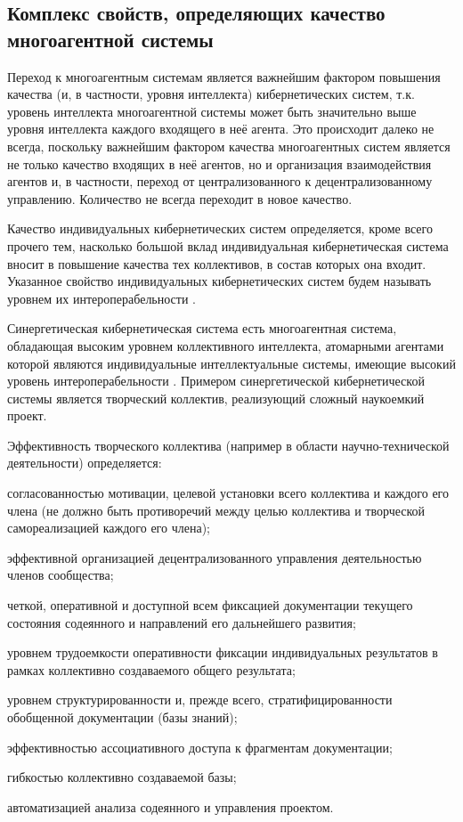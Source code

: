 \subsection{Комплекс свойств, определяющих качество многоагентной системы}
{\label{sec_mas_overall_quality}} 

Переход к многоагентным системам является важнейшим фактором повышения качества (и, в частности, уровня интеллекта) кибернетических систем, т.к. уровень интеллекта многоагентной системы может быть значительно выше уровня интеллекта каждого входящего в неё агента. 
Это происходит далеко не всегда, поскольку важнейшим фактором качества многоагентных систем является не только качество входящих в неё агентов, но и организация взаимодействия агентов и, в частности, переход от централизованного к децентрализованному управлению. 
Количество не всегда переходит в новое качество.

Качество индивидуальных кибернетических систем определяется, кроме всего прочего тем, насколько большой вклад индивидуальная кибернетическая система вносит в повышение качества тех коллективов, в состав которых она входит.
Указанное свойство индивидуальных кибернетических систем будем называть уровнем их интероперабельности .

Синергетическая кибернетическая система есть многоагентная система, обладающая высоким уровнем коллективного интеллекта, атомарными агентами которой являются индивидуальные интеллектуальные системы, имеющие высокий уровень интероперабельности  .
Примером синергетической кибернетической системы является творческий коллектив, реализующий сложный наукоемкий проект.

Эффективность творческого коллектива (например в области научно-технической деятельности) определяется:
\begin{textitemize}
    \item согласованностью мотивации, целевой установки всего коллектива и каждого его члена (не должно быть противоречий между целью коллектива и творческой самореализацией каждого его члена);
    \item эффективной организацией децентрализованного управления деятельностью членов сообщества;
    \item четкой, оперативной и доступной всем фиксацией документации текущего состояния содеянного и направлений его дальнейшего развития;
    \item уровнем трудоемкости оперативности фиксации индивидуальных результатов в рамках коллективно создаваемого общего результата;
    \item уровнем структурированности и, прежде всего, стратифицированности обобщенной документации (базы знаний);
    \item эффективностью ассоциативного доступа к фрагментам документации;
    \item гибкостью коллективно создаваемой базы;
    \item автоматизацией анализа содеянного и управления проектом.
\end{textitemize}

